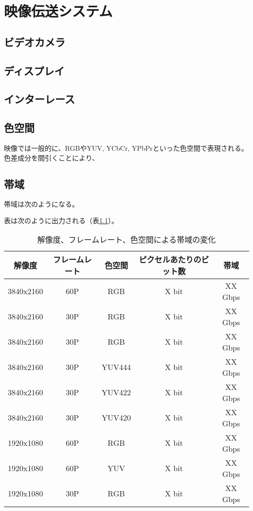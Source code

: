 \chapter{映像伝送システム}
\label{chap:video-transmission}
\section{ビデオカメラ}
\section{ディスプレイ}
\section{インターレース}
\section{色空間}

映像では一般的に、RGBやYUV, YCbCr, YPbPrといった色空間で表現される。
色差成分を間引くことにより、

\section{帯域}

帯域は次のようになる。

表は次のように出力される（表\ref{tb:video-bandwidth}）。

\begin{table}[htbp]
  \caption{解像度、フレームレート、色空間による帯域の変化}
  \label{tb:video-bandwidth}
  \begin{center}
  \begin{tabular}{c|c|c|c|c}
    \hline
    解像度     & フレームレート & 色空間 & ピクセルあたりのビット数 & 帯域\\\hline\hline
    3840x2160 & 60P          & RGB    & X bit               & XX Gbps\\\hline
    3840x2160 & 30P          & RGB    & X bit               & XX Gbps\\\hline
    3840x2160 & 30P          & RGB    & X bit               & XX Gbps\\\hline
    3840x2160 & 30P          & YUV444 & X bit               & XX Gbps\\\hline
    3840x2160 & 30P          & YUV422 & X bit               & XX Gbps\\\hline
    3840x2160 & 30P          & YUV420 & X bit               & XX Gbps\\\hline
    1920x1080 & 60P          & RGB    & X bit               & XX Gbps\\\hline
    1920x1080 & 60P          & YUV    & X bit               & XX Gbps\\\hline
    1920x1080 & 30P          & RGB    & X bit               & XX Gbps\\\hline
  \end{tabular}\end{center}
\end{table}


